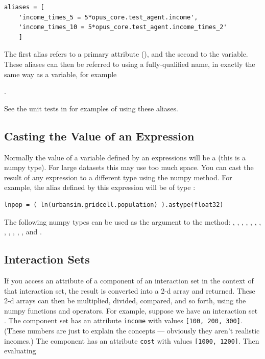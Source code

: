 \begin{verbatim}
aliases = [
    'income_times_5 = 5*opus_core.test_agent.income',
    'income_times_10 = 5*opus_core.test_agent.income_times_2'
    ]
\end{verbatim}

The first alias refers to a primary attribute (),
and the second to the variable.  These aliases can then be referred to
using a fully-qualified name, in exactly the same way as a variable,
for example

.  

See the unit tests in
 for examples of
using these aliases.

\subsection{Casting the Value of an Expression}

Normally the value of a variable defined by an expressions will be a
 (this is a numpy type).  For large datasets this may use too
much space.  You can cast the result of any expression to a different type
using the numpy  method.  For example, the alias defined by
this expression will be of type :

\begin{verbatim}
lnpop = ( ln(urbansim.gridcell.population) ).astype(float32)
\end{verbatim}

The following numpy types can be used as the argument to the 
method: , , , ,
, , , , 
, , , , and
.
 
\subsection{Interaction Sets}

If you access an attribute of a component of an interaction set in the
context of that interaction set, the result is converted into a 2-d array
and returned.  These 2-d arrays can then be multiplied, divided, compared,
and so forth, using the numpy functions and operators.  For example,
suppose we have an interaction set .  The
component  set has an attribute \verb|income| with values
\verb|[100, 200, 300]|.  (These numbers are just to explain the concepts
--- obviously they aren't realistic incomes.)  The 
component has an attribute \verb|cost| with values \verb|[1000, 1200]|.
Then evaluating

